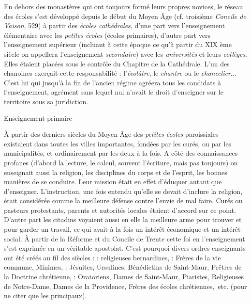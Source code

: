 En dehors des monastères qui ont toujours formé leurs propres novices, le réseau des écoles s'est développé depuis le début du Moyen Âge (cf. troisième \emph{Concile de Vaison}, 529) à partir des \emph{écoles cathédrales}, d'une part vers l'enseignement élémentaire avec les \emph{petites écoles} (écoles primaires), d'autre part vers l'enseignement supérieur (incluant à cette époque ce qu'à partir du XIX ème siècle on appellera l'enseignement \emph{secondaire}) avec les \emph{universités} et leurs \emph{collèges}.  Elles étaient placées sous le contrôle du Chapitre de la Cathédrale. L'un des chanoines exerçait cette responsabilité : l'\emph{écolâtre},  le \emph{chantre} ou le \emph{chancelier}... C'est lui qui jusqu'à la fin de l'ancien régime agréera tous les candidats à l'enseignement, agrément sans lequel nul n'avait le droit d'enseigner sur le territoire sous sa juridiction.

Enseignement primaire

À partir des derniers siècles du Moyen Âge des \emph{petites écoles} paroissiales existaient dans toutes les villes importantes, fondées par les curés, ou par les municipalités, et ordinairement par les deux à la fois. A côté des connaissances profanes (d'abord la lecture, le calcul, souvent l'écriture, mais pas toujours) on enseignait aussi la religion, les disciplines du corps et de l'esprit, les bonnes manières de se conduire. Leur mission était en effet d'éduquer autant que d'enseigner. L'instruction, une fois entendu qu'elle se devait d'inclure la religion, était considérée comme la meilleure défense contre l'envie de mal faire. Curés ou pasteurs protestants, parents et autorités locales étaient d'accord sur ce point. D'autre part les citadins voyaient aussi en elle la meilleure arme pour trouver et pour garder un travail, ce qui avait à la fois un intérêt économique et un intérêt social. À partir de la Réforme et du Concile de Trente cette foi en l'enseignement s'est exprimée en un véritable apostolat. C'est pourquoi divers ordres enseignants ont été créés au fil des siècles :
 : religieuses bernardines,
 : Frères de la vie commune, Minimes,
 : Jésuites, Ursulines, Bénédictins de Saint-Maur, Prêtres de la Doctrine chrétienne,
 : Oratoriens, Dames de Saint-Maur, Piaristes, Religieuses de Notre-Dame, Dames de la Providence, Frères des écoles chrétiennes,~etc. (pour ne citer que les principaux).

